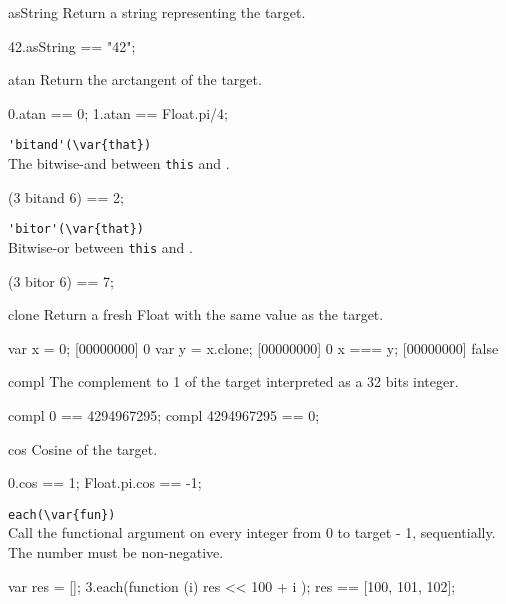\begin{urbiscriptapi}
\item[asString]
  Return a string representing the target.
\begin{urbiassert}
42.asString == "42";
\end{urbiassert}

\item[atan]
  Return the arctangent of the target.
\begin{urbiassert}
0.atan == 0;
1.atan == Float.pi/4;
\end{urbiassert}

\item \lstinline|'bitand'(\var{that})|\\
  The bitwise-and between \lstinline|this| and .
\begin{urbiassert}
(3 bitand 6) == 2;
\end{urbiassert}

\item \lstinline|'bitor'(\var{that})|\\
  Bitwise-or between \lstinline|this| and .
\begin{urbiassert}
(3 bitor 6) == 7;
\end{urbiassert}

\item[clone]
  Return a fresh Float with the same value as the target.
\begin{urbiscript}
var x = 0;
[00000000] 0
var y = x.clone;
[00000000] 0
x === y;
[00000000] false
\end{urbiscript}

\item[compl]
  The complement to 1 of the target interpreted as a 32 bits integer.
\begin{urbiassert}
compl 0 == 4294967295;
compl 4294967295 == 0;
\end{urbiassert}

\item[cos]
  Cosine of the target.
\begin{urbiassert}
0.cos == 1;
Float.pi.cos == -1;
\end{urbiassert}

\item \lstinline|each(\var{fun})|\\
  Call the functional argument  on every integer from 0 to
  target - 1, sequentially.  The number must be non-negative.
\begin{urbiassert}
{
  var res = [];
  3.each(function (i) { res << 100 + i });
  res
}
== [100, 101, 102];


\end{urbiassert}
\end{urbiscriptapi}
